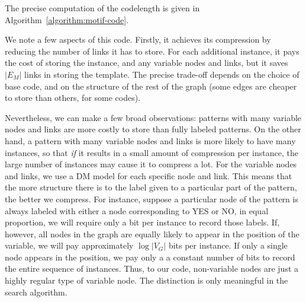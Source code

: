 \documentclass[letterpaper]{article} %
\begin{document}
The precise computation of the codelength is given in Algorithm~\ref{algorithm:motif-code}. 

We note a few aspects of this code. Firstly, it achieves its compression by reducing the number of links it has to store. For each additional instance, it pays the cost of storing the instance, and any variable nodes and links, but it saves $|E_M|$ links in storing the template. The precise trade-off depends on the choice of base code, and on the structure of the rest of the graph (some edges are cheaper to store than others, for some codes).

Nevertheless, we can make a few broad observations: patterns with many variable nodes and links are more costly to store than fully labeled patterns. On the other hand, a pattern with many variable nodes and links is more likely to have many instances, so that \emph{if} it results in a small amount of compression per instance, the large number of instances may cause it to compress a lot. For the variable nodes and links, we use a DM model for each specific node and link. This means that the more structure there is to the label given to a particular part of the pattern, the better we compress. For instance, suppose a particular node of the pattern is always labeled with either a node corresponding to YES or NO, in equal proportion, we will require only a bit per instance to record those labels. If, however, all nodes in the graph are equally likely to appear in the position of the variable, we will pay approximately $\log |V_G|$ bits per instance. If only a single node appears in the position, we pay only a a constant number of bits to record the entire sequence of instances. Thus, to our code, non-variable nodes are just a highly regular type of variable node. The distinction is only meaningful in the search algorithm.
\end{document}
